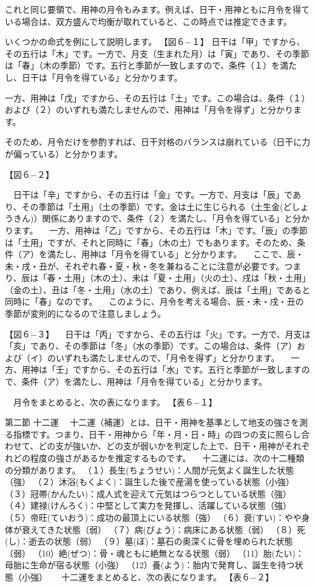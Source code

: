 \documentclass[a5paper,11pt,dvipdfmx]{tarticle}
\begin{document}
これと同じ要領で、用神の月令もみます。例えば、日干・用神ともに月令を得ている場合は、双方盛んで均衡が取れていると、この時点では推定できます。

いくつかの命式を例にして説明します。
【図６−１】
日干は「甲」ですから、その五行は「木」です。一方で、月支（生まれた月）は「寅」であり、その季節は「春」（木の季節）です。五行と季節が一致しますので、条件（１）を満たし、日干は「月令を得ている」と分かります。

一方、用神は「戊」ですから、その五行は「土」です。この場合は、条件（１）および（２）のいずれも満たしませんので、用神は「月令を得ず」と分かります。

そのため、月令だけを参酌すれば、日干対格のバランスは崩れている（日干に力が偏っている）と分かります。

【図６−２】

　日干は「辛」ですから、その五行は「金」です。一方で、月支は「辰」であり、その季節は「土用」（土の季節）です。金は土に生じられる（土生金(どしょうきん)）関係にありますので、条件（２）を満たし、「月令を得ている」と分かります。
　一方、用神は「乙」ですから、その五行は「木」です。「辰」の季節は「土用」ですが、それと同時に「春」（木の土）でもあります。そのため、条件（ア）を満たし、用神は「月令を得ている」と分かります。
　ここで、辰・未・戌・丑が、それぞれ春・夏・秋・冬を兼ねることに注意が必要です。つまり、辰は「春・土用」（木の土）、未は「夏・土用」（火の土）、戌は「秋・土用」（金の土）、丑は「冬・土用」（水の土）であり、例えば、辰は「土用」であると同時に「春」なのです。
　このように、月令を考える場合、辰・未・戌・丑の季節が変則的になるので注意しましょう。

【図６−３】
　日干は「丙」ですから、その五行は「火」です。一方で、月支は「亥」であり、その季節は「冬」（水の季節）です。この場合は、条件（ア）および（イ）のいずれも満たしませんので、「月令を得ず」と分かります。
　一方、用神は「壬」ですから、その五行は「水」です。五行と季節が一致しますので、条件（ア）を満たし、用神は「月令を得ている」と分かります。

　月令をまとめると、次の表になります。
【表６−１】

第二節	十二運
　十二運（補運）とは、日干・用神を基準として地支の強さを測る指標です。つまり、日干・用神から「年・月・日・時」の四つの支に照らし合わせて、どの支が強いか、どの支が弱いかを判定した上で、日干・用神がそれぞれどの程度の強さがあるかを推定するものです。
　十二運には、次の十二種類の分類があります。
（１）長生(ちょうせい)：人間が元気よく誕生した状態（強）
（２）沐浴(もくよく)：誕生した後で産湯を使っている状態（小強）
（３）冠帯(かんたい)：成人式を迎えて元気はつらつとしている状態（強）
（４）建禄(けんろく)：中堅として実力を発揮し、活躍している状態（強）
（５）帝旺(ていおう)：成功の最頂上にいる状態（強）
（６）衰(すい)：やや身体が衰えてきた状態（弱）
（７）病(びょう)：病床にある状態（弱）
（８）死(し)：逝去の状態（弱）
（９）墓(ぼ)：墓石の奥深くに骨を埋められた状態（弱）
（10）絶(ぜつ)：骨・魂ともに絶無となる状態（弱）
（11）胎(たい)：母胎に生命が宿る状態（小強）
（12）養(よう)：胎内で発育し、誕生を待つ状態（小強）
　
十二運をまとめると、次の表になります。
【表６−２】
\end{document}

